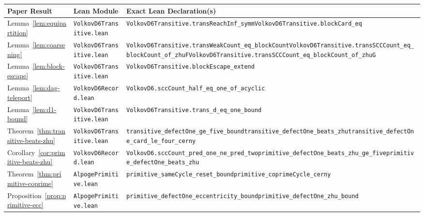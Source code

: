 \documentclass[11pt,a4paper]{article}
\theoremstyle{definition}
\theoremstyle{remark}
\begin{document}
\begin{table}[ht]
\centering
\scriptsize
\setlength{\tabcolsep}{3pt}
\begin{tabular}{@{}>{\raggedright\arraybackslash}p{2.75cm}>{\raggedright\arraybackslash}p{3.65cm}>{\raggedright\arraybackslash}p{9.05cm}@{}}
\toprule
Paper Result & Lean Module & Exact Lean Declaration(s) \\
\midrule
Lemma~\ref{lem:equipartition} & \texttt{VolkovD6Transitive.lean} & \texttt{VolkovD6Transitive.transReachInf\_symm}\newline \texttt{VolkovD6Transitive.blockCard\_eq} \\
Lemma~\ref{lem:coarsening} & \texttt{VolkovD6Transitive.lean} & \texttt{VolkovD6Transitive.transWeakCount\_eq\_blockCount}\newline \texttt{VolkovD6Transitive.transSCCCount\_eq\_blockCount\_of\_zhuF}\newline \texttt{VolkovD6Transitive.transSCCCount\_eq\_blockCount\_of\_zhuG} \\
Lemma~\ref{lem:block-escape} & \texttt{VolkovD6Transitive.lean} & \texttt{VolkovD6Transitive.blockEscape\_extend} \\
Lemma~\ref{lem:dag-teleport} & \texttt{VolkovD6Record.lean} & \texttt{VolkovD6.sccCount\_half\_eq\_one\_of\_acyclic} \\
Lemma~\ref{lem:d1-bound} & \texttt{VolkovD6Transitive.lean} & \texttt{VolkovD6Transitive.trans\_d\_eq\_one\_bound} \\
Theorem~\ref{thm:transitive-beats-zhu} & \texttt{VolkovD6Transitive.lean} & \texttt{transitive\_defectOne\_ge\_five\_bound}\newline \texttt{transitive\_defectOne\_beats\_zhu}\newline \texttt{transitive\_defectOne\_card\_le\_four\_cerny} \\
Corollary~\ref{cor:primitive-beats-zhu} & \texttt{VolkovD6Record.lean} & \texttt{VolkovD6.sccCount\_pred\_one\_ne\_pred\_two}\newline \texttt{primitive\_defectOne\_beats\_zhu\_ge\_five}\newline \texttt{primitive\_defectOne\_beats\_zhu} \\
\midrule
Theorem~\ref{thm:primitive-coprime} & \texttt{AlpogePrimitive.lean} & \texttt{primitive\_sameCycle\_reset\_bound}\newline \texttt{primitive\_coprimeCycle\_cerny} \\
Proposition~\ref{prop:primitive-ecc} & \texttt{AlpogePrimitive.lean} & \texttt{primitive\_defectOne\_eccentricity\_bound}\newline \texttt{primitive\_defectOne\_zhu\_bound} \\

\end{tabular}
\end{table}
\end{document}
